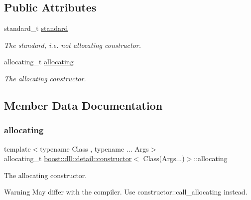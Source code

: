 \subsection*{Public Attributes}
\begin{DoxyCompactItemize}
\item 
standard\+\_\+t \hyperlink{a01356_a6cbccda8c81959e8e3bba7da28cada5d}{standard}
\begin{DoxyCompactList}\small\item\em The standard, i.\+e. not allocating constructor. \end{DoxyCompactList}\item 
allocating\+\_\+t \hyperlink{a01356_a13c90a276dc453ca83da117ffc552362}{allocating}
\begin{DoxyCompactList}\small\item\em The allocating constructor. \end{DoxyCompactList}\end{DoxyCompactItemize}


\subsection{Member Data Documentation}
\mbox{\label{a01356_a13c90a276dc453ca83da117ffc552362}} 
\subsubsection{\texorpdfstring{allocating}{allocating}}
{\footnotesize\ttfamily template$<$typename Class , typename ... Args$>$ \\
allocating\+\_\+t \hyperlink{a01352}{boost\+::dll\+::detail\+::constructor}$<$ Class(Args...)$>$\+::allocating}



The allocating constructor. 

\begin{DoxyWarning}{Warning}
May differ with the compiler. Use constructor\+::call\+\_\+allocating instead. 
\end{DoxyWarning}
\mbox{\label{a01356_a6cbccda8c81959e8e3bba7da28cada5d}} 

